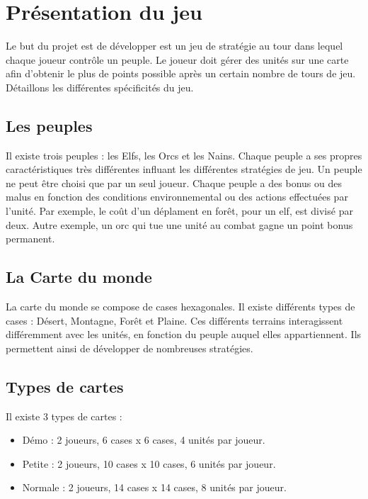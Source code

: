 
\section{Présentation du jeu}
Le but du projet est de développer est un jeu de stratégie au tour dans lequel chaque joueur contrôle un peuple. Le joueur doit gérer des unités sur une carte afin d'obtenir le plus de points possible après un certain nombre de tours de jeu. Détaillons les différentes spécificités du jeu.
\subsection{Les peuples}
Il existe trois peuples : les Elfs, les Orcs et les Nains. Chaque peuple a ses propres caractéristiques très différentes influant les différentes stratégies de jeu. Un peuple ne peut être choisi que par un seul joueur.
Chaque peuple a des bonus ou des malus en fonction des conditions environnemental ou des actions effectuées par l'unité. Par exemple, le coût d'un déplament en forêt, pour un elf, est divisé par deux. Autre exemple, un orc qui tue une unité au combat gagne un point bonus permanent.

\subsection{La Carte du monde}
La carte du monde se compose de cases hexagonales. Il existe différents types de cases : Désert, Montagne, Forêt et Plaine. Ces différents terrains interagissent différemment avec les unités, en fonction du peuple auquel elles appartiennent. Ils permettent ainsi de développer de nombreuses stratégies.

\subsection{Types de cartes}
Il existe 3 types de cartes :
\begin{itemize}
  \item Démo : 2 joueurs, 6 cases x 6 cases, 4 unités par joueur.
  \item Petite : 2 joueurs, 10 cases x 10 cases, 6 unités par joueur.
  \item Normale :  2 joueurs, 14 cases x 14 cases, 8 unités par joueur.
\end{itemize}

